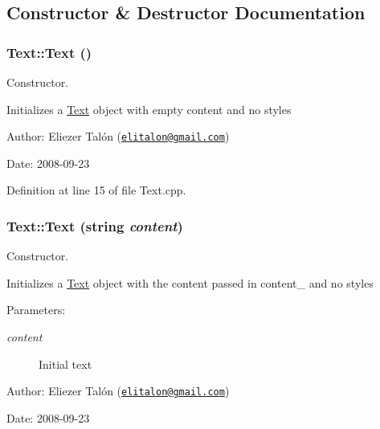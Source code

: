 \subsection{Constructor \& Destructor Documentation}
\hypertarget{class_text_b3e26143fccc52699bcc5149cae852bc}{
\subsubsection[Text]{\setlength{\rightskip}{0pt plus 5cm}Text::Text ()}}
\label{class_text_b3e26143fccc52699bcc5149cae852bc}


Constructor. 

Initializes a \hyperlink{class_text}{Text} object with empty content and no styles

\begin{Desc}
\item[Author:]Eliezer Talón (\href{mailto:elitalon@gmail.com}{\tt elitalon@gmail.com}) \end{Desc}
\begin{Desc}
\item[Date:]2008-09-23 \end{Desc}


Definition at line 15 of file Text.cpp.\hypertarget{class_text_36e53196a53aa8dc7c1de3018d8f0b6d}{
\subsubsection[Text]{\setlength{\rightskip}{0pt plus 5cm}Text::Text (string {\em content})}}
\label{class_text_36e53196a53aa8dc7c1de3018d8f0b6d}


Constructor. 

Initializes a \hyperlink{class_text}{Text} object with the content passed in content\_\- and no styles

\begin{Desc}
\item[Parameters:]
\begin{description}
\item[{\em content}]Initial text\end{description}
\end{Desc}
\begin{Desc}
\item[Author:]Eliezer Talón (\href{mailto:elitalon@gmail.com}{\tt elitalon@gmail.com}) \end{Desc}
\begin{Desc}
\item[Date:]2008-09-23 \end{Desc}


